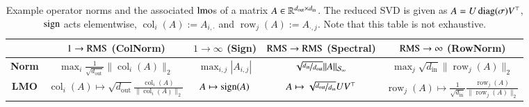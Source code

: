 \begin{table*}
\centering
\caption{Example operator norms and the associated $\lmo$s of a matrix $A \in \mathbb{R}^{d_\mathrm{out} \times d_\mathrm{in}}$. The reduced SVD is given as $A=U\operatorname{diag}(\sigma) V^\top$, $\operatorname{sign}$ acts elementwise, $\operatorname{col}_i(A):=A_{i,\cdot}$ and $\operatorname{row}_j(A):=A_{\cdot,j}$. Note that this table is not exhaustive. }
\label{tbl:operatornorms}
\bgroup
\def\arraystretch{1.2}
\begin{tabular}{|c|c|c|c|c|}
\hline
& $1 \rightarrow \mathrm{RMS}$ (ColNorm) & $1 \rightarrow \infty$ (Sign) & $\mathrm{RMS} \rightarrow \mathrm{RMS}$ (Spectral) & $\mathrm{RMS} \rightarrow \infty$ (RowNorm) \\
\hline\hline
\textbf{Norm} & $\max_i \tfrac{1}{\sqrt{d_\mathrm{out}}}\|\operatorname{col}_i(A)\|_2$ & $\max_{i,j} |A_{i,j}|$ & $\sqrt{\nicefrac{d_\mathrm{in}}{d_\mathrm{out}}}\|A\|_{\mathcal{S}_{\infty}}$ & $\max_j \sqrt{d_\mathrm{in}}\|\operatorname{row}_j(A)\|_2$ \\
\hline
\textbf{LMO} & $\operatorname{col}_i(A)\mapsto \sqrt{d_\mathrm{out}}\tfrac{\operatorname{col}_i(A)}{\|\operatorname{col}_i(A)\|_2}$ & $A\mapsto \operatorname{sign}(A)$ & $A\mapsto\sqrt{\nicefrac{d_\mathrm{out}}{d_\mathrm{in}}}UV^\top$ & $\operatorname{row}_j(A)\mapsto \tfrac{1}{\sqrt{d_\mathrm{in}}}\tfrac{\operatorname{row}_j(A)}{\|\operatorname{row}_j(A)\|_2}$ \\
\hline
\end{tabular}
\egroup
\end{table*}


\begin{table*}
\centering
\caption{The choice of $\lmo$ can be different between layers and can depend on the assumptions on the input. For simplicity we overload notation and write the reduced SVD as $W_\ell = U\diag(\sigma)V^\top \in \R^{d_\mathrm{out} \times d_\mathrm{in}}$ for all $\ell \in [L]$. %
}
\label{tbl:parameter:lmo}
\bgroup
\def\arraystretch{1.2}
\egroup
\end{table*}

